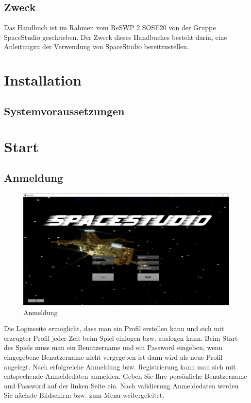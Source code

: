 \documentclass[fontsize=12pt,paper=a4,twoside]{scrartcl}
\begin{document}
\subsection{Zweck}

Das Handbuch ist im Rahmen vom ReSWP 2 SOSE20 von der Gruppe SpaceStudio geschrieben. Der Zweck dieses Handbuches besteht darin, eine Anleitungzu der Verwendung von SpaceStudio bereitzustellen.


\section{Installation}


\subsection{Systemvoraussetzungen}

\section{Start}
\subsection{Anmeldung}
\begin{figure}[htp]
	\includegraphics[width=1.00\linewidth]{pics/loginscreen.png}
	\caption{Anmeldung}
	\label{fig1}
\end{figure}
Die Loginseite ermöglicht, dass man ein Profil erstellen kann und sich mit erzeugter Profil jeder Zeit beim Spiel einlogen bzw. auslogen kann. Beim Start des Spiels muss man ein Benutzername und ein Password eingeben, wenn eingegebene Benutzername nicht vergegeben ist dann wird als neue Profil angelegt. Nach erfolgreiche Anmeldung bzw. Registrierung kann man sich mit entspechende Anmeldedaten anmelden. Geben Sie Ihre persönliche Benutzername und Password auf der linken Seite ein. Nach validierung Anmeldedaten werden Sie nächste Bildschirm bzw. zum Menu weitergeleitet. 
\end{document}
